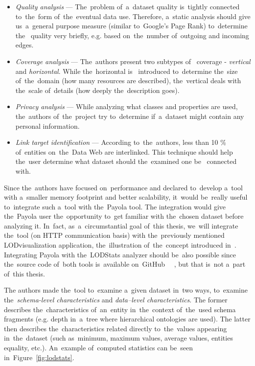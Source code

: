 \begin{itemize}
  \item \emph{Quality analysis} --- The~problem of~a~dataset quality is~tightly connected 
  to~the~form of~the~eventual data use. Therefore, a~static analysis should 
  give us~a~general purpose measure (similar to~Google's Page Rank) to~determine the~  quality very briefly, e.g. based on~the~number of~outgoing and incoming 
  edges.
  
  \item \emph{Coverage analysis} --- The~authors present two subtypes of~  coverage - \emph{vertical} and \emph{horizontal}.  While the~horizontal is~  introduced to~determine the~size of~the~domain (how many resources are described),
  the~vertical deals with the~scale of~details (how deeply the~description goes).
  
  \item \emph{Privacy analysis} --- While analyzing what classes and properties 
  are used, the~authors of~the~project try to~determine if~a~dataset 
  might contain any personal information.
  
  \item \emph{Link target identification} --- According to~the~authors, less than 
  10 \% of~entities on~the~Data Web are interlinked. This technique 
  should help the~user determine what dataset should the~examined one be~  connected with.
\end{itemize}

Since the~authors have focused on~performance and declared to~develop a~tool with a~smaller memory footprint and better scalability, it~would be~really useful to~integrate such a~tool with the~Payola tool.
The integration would give the~Payola user the~opportunity to~get familiar with the~chosen dataset before analyzing it. In~fact, as~a~circumstantial goal of~this 
thesis, we~will integrate the~tool (on HTTP communication basis) with the~previously mentioned 
LODvisualization application, the~illustration of~the~concept introduced 
in~\cite{ldvm}. Integrating Payola with the~LODStats analyzer should be~also 
possible since the~source code of~both tools is~available on~GitHub~\cite{github-payola} 
~\cite{github-lodstats}, but that is~not a~part of~this thesis.

The authors made the~tool to~examine a~given dataset in~two ways, to~examine 
the~\emph{schema-level characteristics} and \emph{data--level characteristics}. 
The former describes the~characteristics of~an~entity in~the~context of~the~used 
schema fragments (e.g. depth in~a~tree where hierarchical ontologies are used). 
The latter then describes the~characteristics related directly to~the~values 
appearing in~the~dataset (such as~minimum, maximum values, average values, entities equality, 
etc.). An~example of~computed statistics can be~seen in~Figure~\ref{fig:lodstats}.

